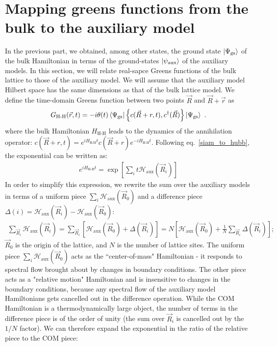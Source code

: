 \documentclass[prb]{revtex4-2}
\begin{document}
\section{Mapping greens functions from the bulk to the auxiliary model}
In the previous part, we obtained, among other states, the ground state \(\ket{\Psi_\text{gs}}\) of the bulk Hamiltonian in terms of the ground-states \(\ket{\psi_\text{aux}}\) of the auxiliary models.
In this section, we will relate real-sapce Greens functions of the bulk lattice to those of the auxiliary model. We will assume that the auxiliary model Hilbert space has the same dimensions as that of the bulk lattice model.
We define the time-domain Greens function between two points \(\vec R\) and \(\vec R + \vec r\) as
\begin{equation}\begin{aligned}
	G_\text{H-H}(\vec r, t) = -i\theta(t) \braket{\Psi_\text{gs} | \left\{ c(\vec R + r,t), c^\dagger(\vec R) \right\} | \Psi_\text{gs}}~.
\end{aligned}\end{equation}
where the bulk Hamiltonian \(H_\text{H-H}\) leads to the dynamics of the annihilation operator: \(c(\vec R + r,t) = e^{i H_\text{H-H} t}c(\vec R + r)e^{-i H_\text{H-H} t}\). Following eq.~\ref{siam_to_hubb}, the exponential can be written as:
\begin{equation}\begin{aligned}
e^{i H_\text{H-H} t} = \exp\left[\sum_i t\mathcal{H}_\text{aux}(\vec R_i)\right] 
\end{aligned}\end{equation}
In order to simplify this expression, we rewrite the sum over the auxiliary models in terms of a uniform piece \(\sum_{i}\mathcal{H}_\text{aux}(\vec R_0)\) and a difference piece \(\Delta(i) = \mathcal{H}_\text{aux}(\vec R_i) - \mathcal{H}_\text{aux}(\vec R_0)\):
\begin{equation}\begin{aligned}
	\sum_{\vec R_i} \mathcal{H}_\text{aux}(\vec R_i) = \sum_{\vec R_i} \left[\mathcal{H}_\text{aux}(\vec R_0) + \Delta(\vec R_i)\right] = N \left[\mathcal{H}_\text{aux}(\vec R_0) + \frac{1}{N}\sum_{\vec R_i} \Delta(\vec R_i)\right];
\end{aligned}\end{equation}
\(\vec R_0\) is the origin of the lattice, and \(N\) is the number of lattice sites. The uniform piece \(\sum_{i}\mathcal{H}_\text{aux}(\vec R_0)\) acts as the ``center-of-mass" Hamiltonian - it responds to spectral flow brought about by changes in boundary conditions. The other piece acts as a "relative motion" Hamiltonian and is insensitive to changes in the boundary conditions, because any spectral flow of the auxiliary model Hamiltonians gets cancelled out in the difference operation. While the COM Hamiltonian is a thermodynamically large object, the number of terms in the difference piece is of the order of unity (the sum over \(\vec R_i\) is cancelled out by the \(1/N\) factor). We can therefore expand the exponential in the ratio of the relative piece to the COM piece:
\end{document}

